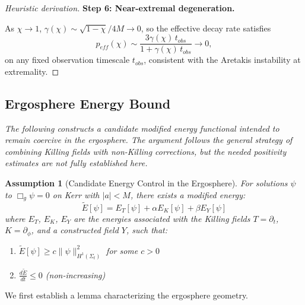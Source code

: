 \documentclass[12pt,a4paper]{article}
\newtheorem{assumption}[theorem]{Assumption}
\begin{document}
\begin{proof}[Heuristic derivation]
\textbf{Step 6: Near-extremal degeneration.}

As $\chi \to 1$, $\gamma(\chi) \sim \sqrt{1-\chi}/4M \to 0$, so the effective decay rate satisfies
\begin{equation}
p_{eff}(\chi) \sim \frac{3\gamma(\chi)\,t_{obs}}{1+\gamma(\chi)\,t_{obs}} \to 0,
\end{equation}
on any fixed observation timescale $t_{obs}$, consistent with the Aretakis instability at extremality.
\end{proof}

\subsection{Ergosphere Energy Bound}

\textit{The following constructs a candidate modified energy functional intended to remain coercive in the ergosphere. The argument follows the general strategy of combining Killing fields with non-Killing corrections, but the needed positivity estimates are not fully established here.}

\begin{assumption}[Candidate Energy Control in the Ergosphere]\label{thm:ergo-energy}
For solutions $\psi$ to $\Box_g\psi = 0$ on Kerr with $|a| < M$, there exists a modified energy:
\begin{equation}
\tilde{E}[\psi] = E_T[\psi] + \alpha E_K[\psi] + \beta E_Y[\psi]
\end{equation}
where $E_T$, $E_K$, $E_Y$ are the energies associated with the Killing fields $T = \partial_t$, $K = \partial_\phi$, and a constructed field $Y$, such that:
\begin{enumerate}
    \item $\tilde{E}[\psi] \geq c\|\psi\|_{H^1(\Sigma_t)}^2$ for some $c > 0$
    \item $\frac{d\tilde{E}}{dt} \leq 0$ (non-increasing)
\end{enumerate}
\end{assumption}

We first establish a lemma characterizing the ergosphere geometry.
\end{document}
